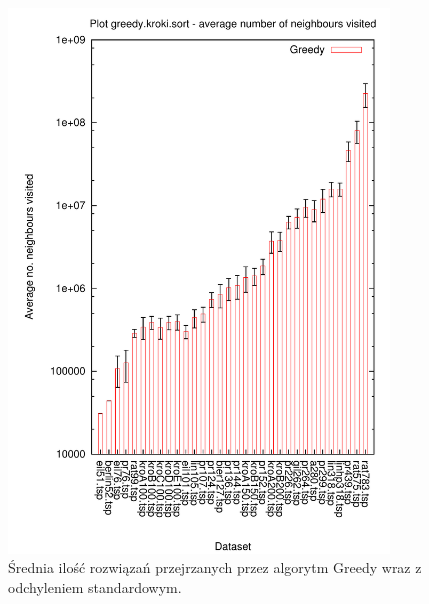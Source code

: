 \begin{figure}
\begin{center}
\includegraphics[width=0.9\textwidth]{wykresy/greedy_sasiedzi}
\end{center}
\caption{Średnia ilość rozwiązań przejrzanych przez algorytm Greedy wraz z odchyleniem standardowym.}
\label{greedy_sasiedzi}
\end{figure}

